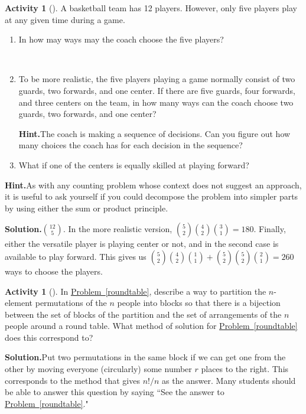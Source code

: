 \documentclass[10pt,]{book}
\theoremstyle{plain}
\theoremstyle{definition}
\newtheorem{activity}[project]{Activity}
\numberwithin{equation}{chapter}
\begin{document}
\begin{activity}[]\label{activity-40}
A basketball team has 12 players. However, only five players play at any given time during a game.%
~\par
\begin{enumerate}[label=(\alph*)]
 \item In how may ways may the coach choose the five players?%

~\par
\item To be more realistic, the five players playing a game normally consist of two guards, two forwards, and one center.  If there are five guards, four forwards, and three centers on the team, in how many ways can the coach choose two guards, two forwards, and one center?%
\par\medskip\noindent%
\textbf{Hint.}\quad The coach is making a sequence of decisions. Can you figure out how many choices the coach has for each decision in the sequence?
~\par
\item What if one of the centers is equally skilled at playing forward?%

\end{enumerate}
\par\medskip\noindent%
\textbf{Hint.}\quad As with any counting problem whose context does not suggest an approach, it is useful to ask yourself if you could decompose the problem into simpler parts by using either the sum or product principle.\par\medskip\noindent%
\textbf{Solution.}\quad \(12\choose 5\). In the more realistic version, \({5\choose2}{4\choose2}{3\choose1}=180\). Finally, either the versatile player is playing center or not, and in the second case is available to play forward. This gives us \({5\choose2}{4\choose2}{1\choose1}+{5\choose2}{5\choose2}{2\choose1}=260\) ways to choose the players.%
\end{activity}
\begin{activity}[]\label{roundtablepartition}
In \hyperref[roundtable]{Problem~\ref{roundtable}}, describe a way to partition the \(n\)-element permutations of the \(n\) people into blocks so that there is a bijection between the set of blocks of the partition and the set of arrangements of the \(n\) people around a round table. What method of solution for \hyperref[roundtable]{Problem~\ref{roundtable}} does this correspond to?%
\par\medskip\noindent%
\textbf{Solution.}\quad Put two permutations in the same block if we can get one from the other by moving everyone (circularly) some number \(r\) places to the right. This corresponds to the method that gives \(n!/n\) as the answer. Many students should be able to answer this question by saying ``See the answer to \hyperref[roundtable]{Problem~\ref{roundtable}}."%
\end{activity}
\end{document}
